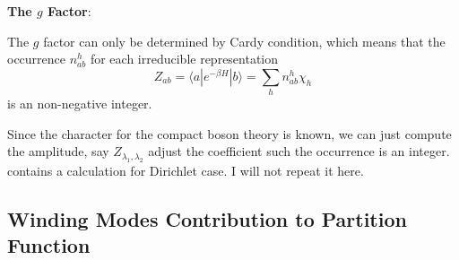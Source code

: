 \documentclass{article}
\begin{document}
{\bf The $g$ Factor}: 

The $g$ factor can only be determined by Cardy condition, which means that the occurrence $n^h_{ab}$ for each irreducible representation
\begin{equation}
Z_{ab} = \langle a | e^{- \beta  H }  | b \rangle  = \sum_{h} n_{ab}^h \chi_h 
\end{equation}
is an non-negative integer. 

Since the character for the compact boson theory is known, we can just compute the amplitude, say $Z_{\lambda_1, \lambda_2}$ adjust the coefficient such the occurrence is an integer. \cite{bachas_fusion_2008} contains a calculation for Dirichlet case. I will not repeat it here. 


\subsection{Winding Modes Contribution to Partition Function}
\end{document}
